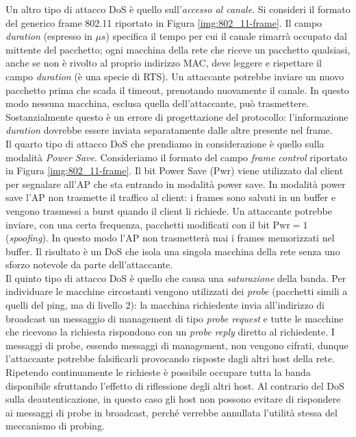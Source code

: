 \newpage
Un altro tipo di attacco DoS è quello sull'\textit{accesso al canale}. Si consideri il formato del generico frame 802.11 riportato in Figura \ref{img:802_11-frame}. Il campo \textit{duration} (espresso in $\mu s$) specifica il tempo per cui il canale rimarrà occupato dal mittente del pacchetto; ogni macchina della rete che riceve un pacchetto qualsiasi, anche se non è rivolto al proprio indirizzo MAC, deve leggere e rispettare il campo \textit{duration} (è una specie di RTS). Un attaccante potrebbe inviare un nuovo pacchetto prima che scada il timeout, prenotando nuovamente il canale. In questo modo nessuna macchina, esclusa quella dell'attaccante, può trasmettere. Sostanzialmente questo è un errore di progettazione del protocollo: l'informazione \textit{duration} dovrebbe essere inviata separatamente dalle altre presente nel frame.\\

Il quarto tipo di attacco DoS che prendiamo in considerazione è quello sulla modalità \textit{Power Save}. Consideriamo il formato del campo \textit{frame control} riportato in Figura \ref{img:802_11-frame}. Il bit Power Save (Pwr) viene utilizzato dal client per segnalare all'AP che sta entrando in modalità power save. In modalità power save l'AP non trasmette il traffico al client: i frames sono salvati in un buffer e vengono trasmessi a burst quando il client li richiede. Un attaccante potrebbe inviare, con una certa frequenza, pacchetti modificati con il bit $\text{Pwr} = 1$ (\textit{spoofing}). In questo modo l'AP non trasmetterà mai i frames memorizzati nel buffer. Il risultato è un DoS che isola una singola macchina della rete senza uno sforzo notevole da parte dell'attaccante.\\

Il quinto tipo di attacco DoS è quello che causa una \textit{saturazione} della banda. Per individuare le macchine circostanti vengono utilizzati dei \textit{probe} (pacchetti simili a quelli del ping, ma di livello 2): la macchina richiedente invia all'indirizzo di broadcast un messaggio di management di tipo \textit{probe request} e tutte le macchine che ricevono la richiesta rispondono con un \textit{probe reply} diretto al richiedente. I messaggi di probe, essendo messaggi di management, non vengono cifrati, dunque l'attaccante potrebbe falsificarli provocando risposte dagli altri host della rete. Ripetendo continuamente le richieste è possibile occupare tutta la banda disponibile sfruttando l'effetto di riflessione degli altri host. Al contrario del DoS sulla deautenticazione, in questo caso gli host non possono evitare di rispondere ai messaggi di probe in broadcast, perché verrebbe annullata l'utilità stessa del meccanismo di probing.\\

